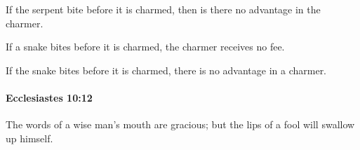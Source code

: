 			\begin{versebox}
					\item[BHS] 
					\item[LXX] 
					\item[ASV] If the serpent bite before it is charmed, then is there no advantage in the charmer.
					\item[NIV] If a snake bites before it is charmed, the charmer receives no fee.
					\item[NRSV] If the snake bites before it is charmed, there is no advantage in a charmer.
			\end{versebox}

		\paragraph{Ecclesiastes 10:12} %
			\label{ECCLESIASTES-10-12}

			The words of a wise man’s mouth are gracious; but the lips of a fool will swallow up himself.

